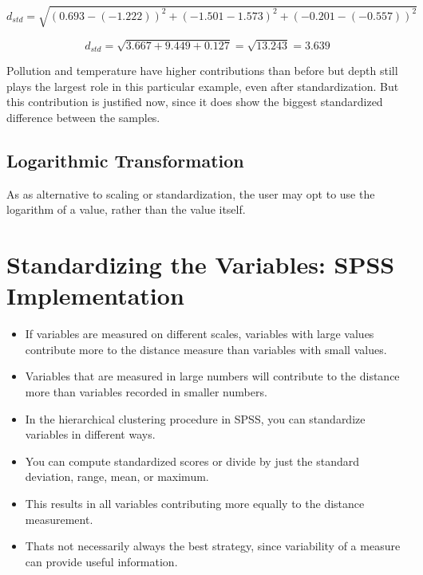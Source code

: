 \documentclass[a4paper,12pt]{report}
\begin{document}
\[ d_{std} =  \sqrt{(0.693 - (- 1.222))^2 + (-1.501-1.573)^2 + (-0.201-(-0.557))^2} \]

\[ d_{std} = \sqrt{3.667 + 9.449 + 0.127} = \sqrt{13.243} = 3.639 \]

Pollution and temperature have higher contributions than before but depth still plays the
largest role in this particular example, even after standardization. But this contribution is
justified now, since it does show the biggest standardized difference between the samples. 
\subsection{Logarithmic Transformation}
As as alternative to scaling or standardization, the user may opt to use the logarithm of a value, rather than the value itself.
\newpage
\section{Standardizing the Variables: SPSS Implementation}
\begin{itemize}
	\item If variables are measured on different scales, variables with large values contribute
	more to the distance measure than variables with small values.
	\item Variables that are measured in large numbers will contribute to the distance more than variables recorded in smaller
	numbers.
	
	\item In the hierarchical clustering procedure in SPSS, you can standardize variables in
	different ways. 
	\item You can compute standardized scores or divide by just the standard
	deviation, range, mean, or maximum. 
	\item This results in all variables contributing more
	equally to the distance measurement. 
	\item Thats not necessarily always the best strategy,
	since variability of a measure can provide useful information. 
\end{itemize}
\end{document}

